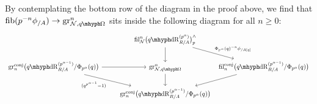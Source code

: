 \documentclass[DIV=12,numbers=enddot,leqno,bibliography=totoc]{scrartcl}
\begin{document}
	\begin{rem}\label{rem:NygaardFibreSequence}
		By contemplating the bottom row of the diagram in the proof above, we find that $\fib(p^{-n}\phi_{/A})\rightarrow \gr_{\Nn, \qOmega}^n$ sits inside the following diagram for all $n\geqslant 0$:
		\begin{equation*}
			\begin{tikzcd}
				&  \fil_\Nn^n\bigl(\qdeRham_{R/A}^{(p^\alpha)}\bigr)_p^\complete\dar\drar["\Phi_{p^\alpha}(q)^{-n}\phi_{/A[q]}"] &[-2em] \\
				\gr_n^\mathrm{conj}\bigl(\qdeRham_{R/A}^{(p^{\alpha-1})}/\Phi_{p^\alpha}(q)\bigr)\rar\drar["(q^{p^{\alpha-1}}-1)"'] & \gr_{\Nn, \qOmega}^n\dar &  \fil_n^\mathrm{conj}\bigl(\qdeRham_{R/A}^{(p^{\alpha-1})}/\Phi_{p^\alpha}(q)\bigr)\dlar\\
				& \gr_n^\mathrm{conj}\bigl(\qdeRham_{R/A}^{(p^{\alpha-1})}/\Phi_{p^\alpha}(q)\bigr) & 
			\end{tikzcd}
		\end{equation*}
	\end{rem}
	
\end{document}
